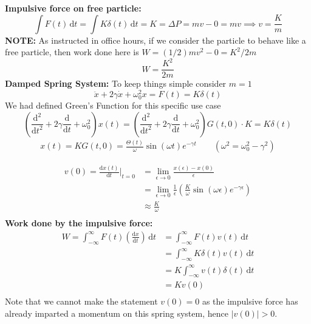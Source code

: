 \documentclass[letterpaper]{article}
\begin{document}
\newpage
{
}
\textbf{Impulsive force on free particle:}
\[
\int F(t) \, \mathrm{d} t =  \int K \delta(t) \, \mathrm{d} t = K = \Delta P = m v - 0 = mv \implies
v = \frac{K}{m}
\]
\textbf{NOTE:} As instructed in office hours, if we consider the particle to behave like a free particle, then work done here is $W = (1 / 2) m v^2 - 0 = K^2 / 2 m $ 
\[
W = \frac{K^2}{2 m}
\] 
\vspace{0.2cm}
\textbf{Damped Spring System:} To keep things simple consider $m=1$
\[
\ddot{x} + 2 \gamma \dot{x} + \omega_0^2 x = F(t) = K \delta(t)
\]
We had defined Green's Function for this specific use case 
\[
	\left( \frac{\mathrm{d} ^2}{\mathrm{d} t^2} + 
		2 \gamma \frac{\mathrm{d} }{\mathrm{d} t} + 
		\omega_0^2
	\right) x(t) =
	\left( \frac{\mathrm{d} ^2}{\mathrm{d} t^2} + 
		2 \gamma \frac{\mathrm{d} }{\mathrm{d} t} + 
		\omega_0^2
	\right) G(t,0) \cdot K = K \delta(t)
\] 
\begin{align*}  x(t) = 
 K G(t,0) = \frac{\Theta(t)}{\omega} \sin\left(\omega t\right) e^{- \gamma t} \qquad (\omega ^2 = \omega_0^2 - \gamma^2 )
\end{align*}  

\begin{align*}
 v(0) = \frac{\mathrm{d} x(t)}{\mathrm{d} t} \Biggr\vert_{t = 0 } &= \lim_{\epsilon \to 0} \frac{x(\epsilon)	- 
	x(0 ) }{ \epsilon}  \\ &= 
\lim_{\epsilon \to 0}  \frac{1}{\epsilon} 
\left(
	\frac{K}{\omega} \sin(\omega \epsilon) e^{- \gamma \epsilon} 
\right) \\
&\approx
\frac{K}{\omega}
\\
\end{align*}
\textbf{Work done by the impulsive force: }
\begin{align*}
	W = \int_{-\infty}^{\infty} F(t) \left(\frac{\mathrm{d} x}{\mathrm{d} t}\right) \, \mathrm{d} t  &= \int_{-\infty}^{\infty} F(t) v(t) \, \mathrm{d} t  \\ 
	&= \int_{-\infty}^{\infty} K \delta(t) v(t) \, \mathrm{d} t  \\
	&= K \int_{-\infty}^{\infty} v(t) \delta(t) \, \mathrm{d} t  \\
	&= K v(0)  \\
\end{align*}
Note that we cannot make the statement $v(0) = 0$ as the impulsive force has already imparted a momentum on this spring system, hence $|v(0)| > 0$. 
\end{document}
